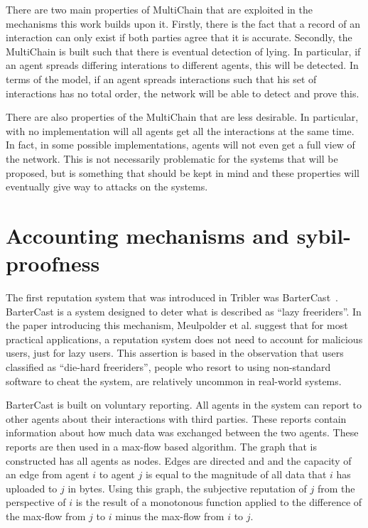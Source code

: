 \documentclass[a4paper,11pt]{book}
\theoremstyle{definition}
\begin{document}
There are two main properties of MultiChain that are exploited in the mechanisms this work builds upon it.
Firstly, there is the fact that a record of an interaction can only exist if both parties agree that it
is accurate. Secondly, the MultiChain is built such that there is eventual detection of lying. In particular,
if an agent spreads differing interations to different agents, this will be detected. In terms of the model,
if an agent spreads interactions such that his set of interactions has no total order, the network will
be able to detect and prove this. 

There are also properties of the MultiChain that are less desirable. In particular, with no implementation
will all agents get all the interactions at the same time. In fact, in some possible implementations, 
agents will not even get a full view of the network. This is not necessarily problematic for the systems
that will be proposed, but is something that should be kept in mind and these properties will eventually
give way to attacks on the systems. 


\chapter{Accounting mechanisms and sybil-proofness}
\label{chap:netflow}

The first reputation system that was introduced in Tribler was BarterCast~\cite{meulpolder2009bartercast}.
BarterCast is a system designed to deter what is described as ``lazy freeriders''.
In the paper introducing this mechanism, Meulpolder et al. suggest that for most practical applications, 
a reputation system does not
need to account for malicious users, just for lazy users. This assertion is based in the observation
that users classified as ``die-hard freeriders'', people who resort to using non-standard software to
cheat the system, are relatively uncommon in real-world systems. 

BarterCast is built on voluntary reporting. All agents in the system can report to other agents
about their interactions with third parties. These reports contain information about how much data
was exchanged between the two agents. These reports are then used in a max-flow based algorithm.
The graph that is constructed has all agents as nodes. Edges are directed and and the capacity
of an edge from agent $i$ to agent $j$ is equal to the magnitude of all data that $i$ has
uploaded to $j$ in bytes. Using this graph, the subjective reputation of $j$ from the perspective
of $i$ is the result of a monotonous function applied to the difference of the max-flow from $j$ to $i$
minus the max-flow from $i$ to $j$.
\end{document}
